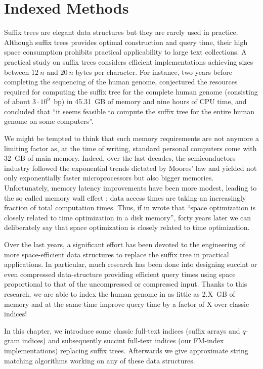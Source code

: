 \chapter{Indexed Methods}
\label{chr:index}

Suffix trees are elegant data structures but they are rarely used in practice.
Although suffix trees provides optimal construction and query time, their high space consumption prohibits practical applicability to large text collections.
A practical study on suffix trees \citep{Kurtz1999} considers efficient implementations achieving sizes between $12~n$ and $20~n$ bytes per character.
For instance, two years before completing the sequencing of the human genome, \citeauthor{Kurtz1999} conjectured the resources required for computing the suffix tree for the complete human genome (consisting of about $3 \cdot 10^9$~bp) in 45.31~GB of memory and nine hours of CPU time, and concluded that ``it seems feasible to compute the suffix tree for the entire human genome on some computers''.

We might be tempted to think that such memory requirements are not anymore a limiting factor as, at the time of writing, standard personal computers come with 32~GB of main memory.
Indeed, over the last decades, the semiconductors industry followed the exponential trends dictated by Moores' law and yielded not only exponentially faster microprocessors but also bigger memories.
Unfortunately, memory latency improvements have been more modest, leading to the so called memory wall effect \citep{?}: data access times are taking an increasingly fraction of total computation times.
Thus, if in \citeyear{Knuth1973} \citeauthor{Knuth1973} wrote that ``space optimization is closely related to time optimization in a disk memory'', forty years later we can deliberately say that space optimization is closely related to time optimization.

Over the last years, a significant effort has been devoted to the engineering of more space-efficient data structures to replace the suffix tree in practical applications.
In particular, much research has been done into designing succint or even compressed data-structure providing efficient query times using space proportional to that of the uncompressed or compressed input.
Thanks to this research, we are able to index the human genome in as little as 2.X~GB of memory and at the same time improve query time by a factor of X over classic indices!

In this chapter, we introduce some classic full-text indices (suffix arrays and $q$-gram indices) and subsequently succint full-text indices (our FM-index implementations) replacing suffix trees.
Afterwards we give approximate string matching algorithms working on any of these data structures.

